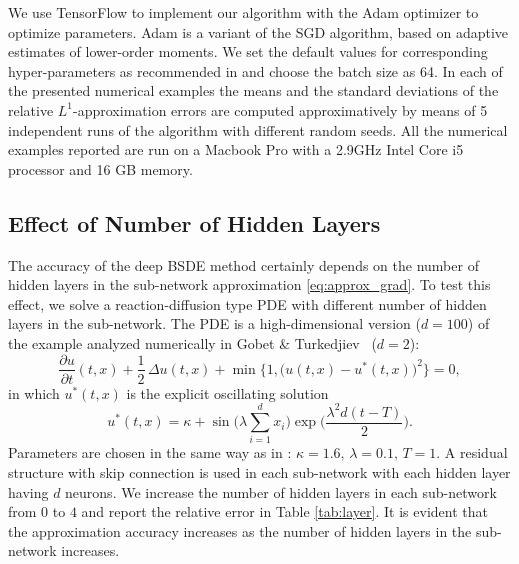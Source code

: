 \documentclass[11pt,english]{article}
\begin{document}
We use TensorFlow \cite{Abadi2016} to implement our algorithm with the Adam optimizer \cite{Kingma2015} to optimize parameters. 
Adam is a variant of the SGD algorithm, based on adaptive estimates of lower-order moments. We set the default values for corresponding hyper-parameters as recommended in \cite{Kingma2015} 
and choose the batch size as 64.
In each of the presented numerical examples the means and the standard deviations of the relative $ L^1 $-approximation errors are computed approximatively by means of 5 independent runs of the algorithm 
with different random seeds.
All the numerical examples reported are run on a Macbook Pro with a 2.9GHz Intel Core i5 processor and 16 GB memory.

\subsection*{Effect of Number of Hidden Layers}
The accuracy of the deep BSDE method certainly depends on the number of hidden layers in the sub-network approximation \eqref{eq:approx_grad}. To test this effect, we solve a reaction-diffusion type PDE with different number of hidden layers in the sub-network. The PDE is a high-dimensional version ($d=100$) of the example analyzed numerically in Gobet \& Turkedjiev~\cite{Gobet2017} ($d=2$):
\begin{equation}  
\label{eq:PDE_Gobet}
  \frac{ \partial u}{ \partial t } ( t, x ) + \frac{ 1 }{ 2 } \, \Delta u (t,x) + 
  \min\!\Big\{1 ,\big(u(t,x) - u^*(t,x)\big)^2\Big\}
   = 0,
\end{equation}
in which $u^*(t,x)$ is the explicit oscillating solution
\begin{equation}
  u^*(t,x) = \kappa + \sin\!\big(\textstyle \lambda \sum_{ i = 1 }^d x_i \big) 
      \exp\!\big( \frac{ \lambda^2 d ( t - T ) }{ 2 } \big).
\end{equation}
Parameters are chosen in the same way as in \cite{Gobet2017}: $\kappa=1.6,\,\lambda=0.1,\,T=1$. A residual structure with skip connection is used in each sub-network with each hidden layer having $d$ neurons. We increase the number of hidden layers in each sub-network from $0$ to $4$ and report the relative error in Table \ref{tab:layer}. It is evident that the approximation accuracy increases as the number of hidden layers in the sub-network increases. 
\end{document}
